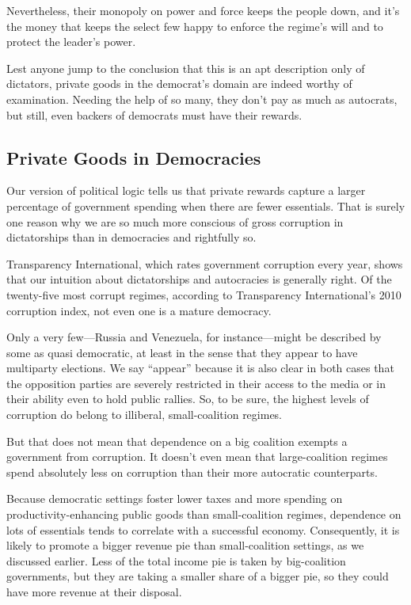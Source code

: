 \documentclass[10pt]{article}
\begin{document}
{\large Nevertheless, their monopoly on power and force keeps the people down,
and it's the money that keeps the select few happy to enforce the regime's will
and to protect the leader's power.}

{\large Lest anyone jump to the conclusion that this is an apt description only
of dictators, private goods in the democrat's domain are indeed worthy of
examination. Needing the help of so many, they don't pay as much as autocrats,
but still, even backers of democrats must have their rewards.}

\subsection{Private Goods in Democracies}

{\large Our version of political logic tells us that private rewards capture a
larger percentage of government spending when there are fewer essentials. That is
surely one reason why we are so much more conscious of gross corruption in
dictatorships than in democracies and rightfully so.}

{\large Transparency International, which rates government corruption every
year, shows that our intuition about dictatorships and autocracies is generally
right. Of the twenty-five most corrupt regimes, according to Transparency
International's 2010 corruption index, not even one is a mature democracy.}

{\large Only a very few---Russia and Venezuela, for instance---might be
described by some as quasi democratic, at least in the sense that they appear to
have multiparty elections. We say ``appear'' because it is also clear in both
cases that the opposition parties are severely restricted in their access to the
media or in their ability even to hold public rallies. So, to be sure, the
highest levels of corruption do belong to illiberal, small-coalition regimes.}

{\large But that does not mean that dependence on a big coalition exempts a
government from corruption. It doesn't even mean that large-coalition regimes
spend absolutely less on corruption than their more autocratic counterparts.}

{\large Because democratic settings foster lower taxes and more spending on
productivity-enhancing public goods than small-coalition regimes, dependence on
lots of essentials tends to correlate with a successful economy. Consequently, it
is likely to promote a bigger revenue pie than small-coalition settings, as we
discussed earlier. Less of the total income pie is taken by big-coalition
governments, but they are taking a smaller share of a bigger pie, so they could
have more revenue at their disposal.}
\end{document}
